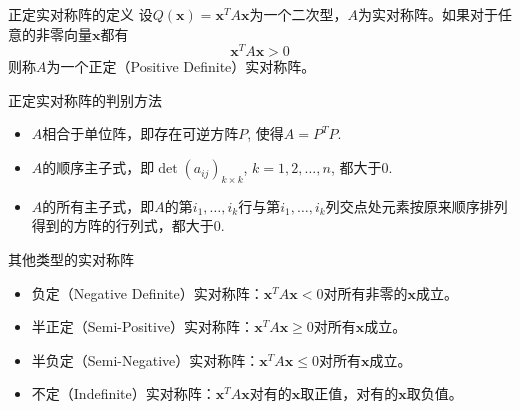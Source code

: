 
\begin{frame}

\begin{block}{正定实对称阵的定义}
设$Q(\mathbf{x}) = \mathbf{x}^T A \mathbf{x}$为一个二次型，$A$为实对称阵。如果对于任意的非零向量$\mathbf{x}$都有
\[\mathbf{x}^T A \mathbf{x} > 0\]
则称$A$为一个正定（Positive Definite）实对称阵。
\end{block}

\vspace{1em}
\pause

\begin{block}{正定实对称阵的判别方法}
\begin{itemize}
\item $A$相合于单位阵，即存在可逆方阵$P$, 使得$A = P^TP$.
\item $A$的顺序主子式，即$\det (a_{ij})_{k\times k}$, $k = 1,2,\ldots,n$, 都大于0.
\item $A$的所有主子式，即$A$的第$i_1,\ldots,i_k$行与第$i_1,\ldots,i_k$列交点处元素按原来顺序排列得到的方阵的行列式，都大于0.
\end{itemize}
\end{block}

\end{frame}


\begin{frame}

\begin{block}{其他类型的实对称阵}
\begin{itemize}
\item 负定（Negative Definite）实对称阵：$\mathbf{x}^T A \mathbf{x} < 0$对所有非零的$\mathbf{x}$成立。\newline
\item 半正定（Semi-Positive）实对称阵：$\mathbf{x}^T A \mathbf{x} \geqslant 0$对所有$\mathbf{x}$成立。\newline
\item 半负定（Semi-Negative）实对称阵：$\mathbf{x}^T A \mathbf{x} \leqslant 0$对所有$\mathbf{x}$成立。\newline
\item 不定（Indefinite）实对称阵：$\mathbf{x}^T A \mathbf{x}$对有的$\mathbf{x}$取正值，对有的$\mathbf{x}$取负值。
\end{itemize}
\end{block}

\end{frame}

